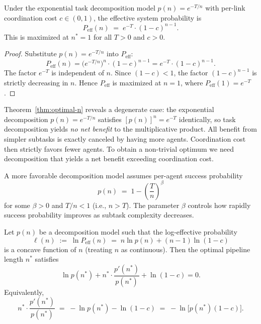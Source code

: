\begin{theorem}
\label{thm:optimal-n}
Under the exponential task decomposition model $p(n) = e^{-T/n}$ with per-link
coordination cost $c \in (0,1)$, the effective system probability is
\[
  P_{\mathrm{eff}}(n) \;=\; e^{-T} \cdot (1-c)^{n-1}.
\]
This is maximized at $n^* = 1$ for all $T > 0$ and $c > 0$.
\end{theorem}

\begin{proof}
Substitute $p(n) = e^{-T/n}$ into $P_{\mathrm{eff}}$:
\[
  P_{\mathrm{eff}}(n)
  = \bigl(e^{-T/n}\bigr)^n \cdot (1-c)^{n-1}
  = e^{-T} \cdot (1-c)^{n-1}.
\]
The factor $e^{-T}$ is independent of $n$. Since $(1-c) < 1$, the factor $(1-c)^{n-1}$
is strictly decreasing in $n$. Hence $P_{\mathrm{eff}}$ is maximized at $n = 1$, where
$P_{\mathrm{eff}}(1) = e^{-T}$.
\end{proof}

\begin{remark}
Theorem~\ref{thm:optimal-n} reveals a degenerate case: the exponential decomposition
$p(n) = e^{-T/n}$ satisfies $[p(n)]^n = e^{-T}$ identically, so task decomposition
yields \emph{no net benefit} to the multiplicative product. All benefit from simpler
subtasks is exactly canceled by having more agents. Coordination cost then strictly
favors fewer agents. To obtain a non-trivial optimum we need decomposition that
yields a net benefit exceeding coordination cost.
\end{remark}

\begin{definition}
\label{def:power-decomp}
A more favorable decomposition model assumes per-agent success probability
\[
  p(n) \;=\; 1 - \left(\frac{T}{n}\right)^{\!\beta}
\]
for some $\beta > 0$ and $T/n < 1$ (i.e., $n > T$). The parameter $\beta$ controls
how rapidly success probability improves as subtask complexity decreases.
\end{definition}

\begin{theorem}
\label{thm:optimal-n-general}
Let $p(n)$ be a decomposition model such that the log-effective probability
\[
  \ell(n) \;:=\; \ln P_{\mathrm{eff}}(n) \;=\; n \ln p(n) + (n-1)\ln(1-c)
\]
is a concave function of $n$ (treating $n$ as continuous). Then the optimal pipeline
length $n^*$ satisfies
\[
  \boxed{\ln p(n^*) + n^* \cdot \frac{p'(n^*)}{p(n^*)} + \ln(1-c) = 0.}
\]
Equivalently,
\[
  n^* \cdot \frac{p'(n^*)}{p(n^*)} \;=\; -\ln p(n^*) - \ln(1-c)
  \;=\; -\ln\!\bigl[p(n^*)(1-c)\bigr].
\]
\end{theorem}

